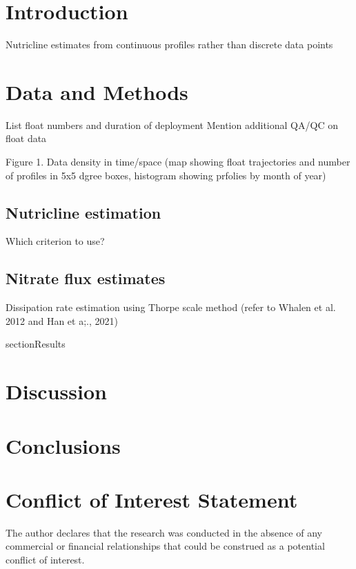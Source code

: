 \documentclass[utf8]{frontiersSCNS} %
\begin{document}
\section{Introduction}

Nutricline estimates from continuous profiles rather than discrete data points

\section{Data and Methods}
List float numbers and duration of deployment
Mention additional QA/QC on float data \citep{maurer2021delayed}

Figure 1. Data density in time/space (map showing float trajectories and number of profiles in 5x5 dgree boxes, histogram showing prfolies by month of year)

\subsection{Nutricline estimation}
Which criterion to use? 

\subsection{Nitrate flux estimates}
Dissipation rate estimation using Thorpe scale method (refer to Whalen et al. 2012 and Han et a;., 2021)


section{Results}



\section{Discussion}


\section{Conclusions}


\section*{Conflict of Interest Statement}

The author declares that the research was conducted in the absence of any commercial or financial relationships that could be construed as a potential conflict of interest.
\end{document}
